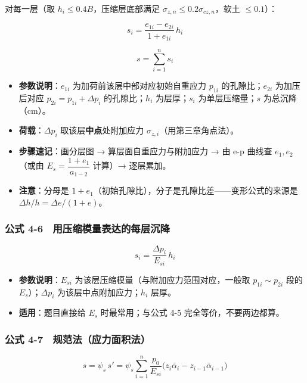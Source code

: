 \documentclass[
]{article}
\providecommand{\tightlist}{%
  \setlength{\itemsep}{0pt}\setlength{\parskip}{0pt}}
\begin{document}
对每一层（取 \(h_i\le0.4B\)，压缩层底部满足
\(\sigma_{z,n}\le0.2\sigma_{cz,n}\)，软土 \(\le0.1\)）：

\[s_i=\frac{e_{1i}-e_{2i}}{1+e_{1i}}\,h_i\]

\[s=\sum_{i=1}^{n}s_i\]

\begin{itemize}
\tightlist
\item
  \textbf{参数说明}：\(e_{1i}\) 为加荷前该层中部对应初始自重应力
  \(p_{1i}\) 的孔隙比；\(e_{2i}\) 为加压后对应
  \(p_{2i}=p_{1i}+\Delta p_i\) 的孔隙比；\(h_i\) 为层厚；\(s_i\)
  为单层压缩量；\(s\) 为总沉降（cm）。
\item
  \textbf{荷载}：\(\Delta p_i\) 取该层\textbf{中点}处附加应力
  \(\sigma_{z,i}\)（用第三章角点法）。
\item
  \textbf{步骤速记}：画分层图 → 算层面自重应力与附加应力 → 由 e-p 曲线查
  \(e_1,e_2\)（或由 \(E_s=\dfrac{1+e_1}{a_{1-2}}\) 计算）→ 逐层累加。
\item
  \textbf{注意}：分母是
  \(1+e_1\)（初始孔隙比），分子是孔隙比差------变形公式的来源是
  \(\Delta h/h=\Delta e/(1+e)\)。
\end{itemize}

\subsubsection{公式
4-6　用压缩模量表达的每层沉降}\label{ux516cux5f0f-4-6-ux7528ux538bux7f29ux6a21ux91cfux8868ux8fbeux7684ux6bcfux5c42ux6c89ux964d}

\[s_i=\frac{\Delta p_i}{E_{si}}\,h_i\]

\begin{itemize}
\tightlist
\item
  \textbf{参数说明}：\(E_{si}\)
  为该层压缩模量（与附加应力范围对应，一般取 \(p_{1i}\sim p_{2i}\) 段的
  \(E_s\)）；\(\Delta p_i\) 为该层中点附加应力；\(h_i\) 层厚。
\item
  \textbf{适用}：题目直接给 \(E_s\) 时最常用；与公式 4-5
  完全等价，不要两边都算。
\end{itemize}

\subsubsection{公式
4-7　规范法（应力面积法）}\label{ux516cux5f0f-4-7-ux89c4ux8303ux6cd5ux5e94ux529bux9762ux79efux6cd5}

\[s=\psi_s\,s'=\psi_s\sum_{i=1}^{n}\frac{p_0}{E_{si}}\Big(z_i\bar{\alpha}_i-z_{i-1}\bar{\alpha}_{i-1}\Big)\]
\end{document}
